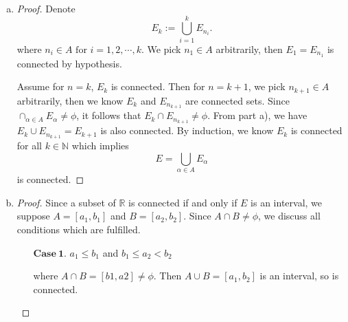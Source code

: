 \begin{Exercise}
\begin{enumerate}[a)]
\begin{proof}
\begin{enumerate}
If $B_2 \neq \phi$, then since $B_2 = B\cap V$, we claim $B_1$ and $B_2$ separate $B$ by definition.
Otherwise $B_2 = \phi$, then continue to consider
\begin{alignat*}{7}
\quad&& A\cup B &= U\cup V \\
\implies&& A\cap(A\cup B) &= A\cap(U\cup V) \\
\implies&& A &= (A\cap U)\cup (A\cap V) \\
\implies&& A &= A\cap V \\
\implies&& A &\subseteq V.
\end{alignat*}
Since $B\cap V = \phi$ implies $V \subseteq B^c$, so $A \subseteq B^c$. We conclude $A\cap B = \phi$ which leads to a contradiction with hypothesis that $A\cap B\neq \phi$.

A similar argument proves the condition $B\cap V = \phi$. 
\end{enumerate}
Finally, we conclude $A\cap B$ is connected under the hypothesis as promised.
\end{proof}

\item
\begin{proof}
Denote $$E_k := \bigcup_{i=1}^{k}E_{n_i}.$$
where $n_i\in A \mbox{ for } i=1,2,\cdots,k$.
We pick $n_1\in A$ arbitrarily, then $E_1 = E_{n_1}$ is connected by hypothesis.

Assume for $n=k$, $E_k$ is connected. Then for $n=k+1$, we
pick $n_{k+1}\in A$ arbitrarily, then we know $E_k$ and $E_{n_{k+1}}$ are connected sets. Since $\cap_{\alpha\in A}E_{\alpha} \neq \phi$, it follows that $E_k \cap E_{n_{k+1}} \neq \phi$. From part a), we have $E_k \cup E_{n_{k+1}} = E_{k+1}$ is also connected.
By induction, we know $E_k$ is connected for all $k\in\mathbb{N}$ which implies
$$
E = \bigcup_{\alpha\in A} E_{\alpha}
$$ is connected.
\end{proof}

\item
\begin{proof}
Since a subset of $\mathbb{R}$ is connected if and only if $E$ is an interval, we suppose $A = [a_1, b_1]$ and $B = [a_2, b_2]$. Since $A\cap B \neq \phi$, we discuss all conditions which are fulfilled.
\begin{enumerate}
\item [$\mathbf{Case\ 1.}$]
$a_1 \leq b_1$ and $b_1 \leq a_2 < b_2$

where $A\cap B = [b1, a2] \neq \phi$. Then $A\cup B = [a_1, b_2]$ is an interval, so is connected.


\end{enumerate}
\end{proof}
\end{enumerate}
\end{Exercise}
